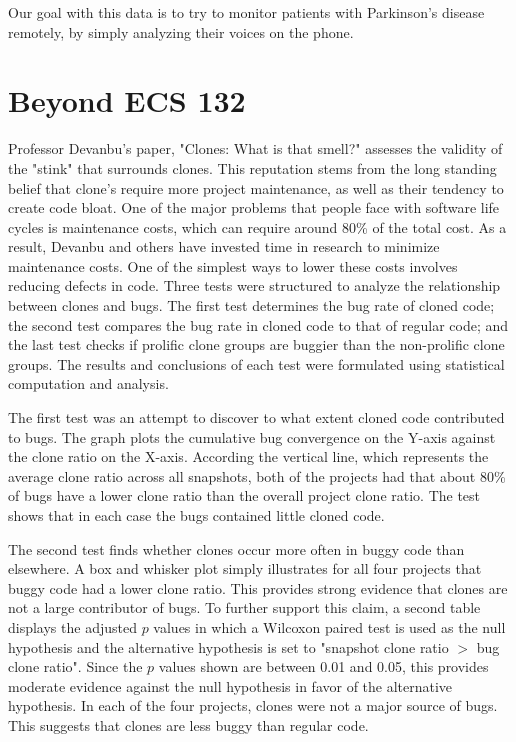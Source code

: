 \documentclass{article}
\begin{document}
Our goal with this data is to try to monitor patients with Parkinson's disease remotely, by
simply analyzing their voices on the phone.

\pagebreak

\section{Beyond ECS 132}

Professor Devanbu's paper, "Clones: What is that smell?" assesses the validity of the "stink" that surrounds clones.  This reputation stems from the long standing belief that clone's require more project maintenance, as well as their tendency to create code bloat. One of the major problems that people face with software life cycles is maintenance costs, which can require around 80\% of the total cost. As a result, Devanbu and others have invested time in research to minimize maintenance costs. One of the simplest ways to lower these costs involves reducing defects in code. Three tests were structured to analyze the relationship between clones and bugs. The first test determines the bug rate of cloned code; the second test compares the bug rate in cloned code to that of regular code; and the last test checks if prolific clone groups are buggier than the non-prolific clone groups. The results and conclusions of each test were formulated using statistical computation and analysis.

The first test was an attempt to discover to what extent cloned code contributed to bugs. The graph plots the cumulative bug convergence on the Y-axis against the clone ratio on the X-axis. According the vertical line, which represents the average clone ratio across all snapshots, both of the projects had that about 80\% of bugs have a lower clone ratio than the overall project clone ratio. The test shows that in each case the bugs contained little cloned code.

The second test finds whether clones occur more often in buggy code than elsewhere. A box and whisker plot simply illustrates for all four projects that buggy code had a lower clone ratio. This provides strong evidence that clones are not a large contributor of bugs. To further support this claim, a second table displays the adjusted $p$ values in which a Wilcoxon paired test is used as the null hypothesis and the alternative hypothesis is set to "snapshot clone ratio $>$ bug clone ratio". Since the $p$ values shown are between 0.01 and 0.05, this provides moderate evidence against the null hypothesis in favor of the alternative hypothesis. In each of the four projects, clones were not a major source of bugs. This suggests that clones are less buggy than regular code.
\end{document}
